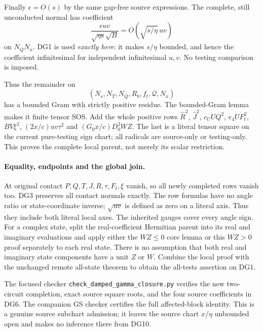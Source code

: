 Finally $\epsilon=O(s)$ by the same gap-free source expressions.
The complete, still unconducted normal has coefficient
\[
 \frac{\epsilon uv}{\sqrt{\eta s}\sqrt B}
         =O\!\left(\sqrt{s/\eta}\,uv\right)          \tag{DG10}
\]
on $N_QN_x$. DG1 is used \emph{exactly here}: it makes $s/\eta$
bounded, and hence the coefficient infinitesimal for independent
infinitesimal $u,v$. No testing comparison is imposed.

Thus the remainder on
\[
                  (N_s,N_T,N_Q,R_b,f_t,\mathcal Q,N_x)
\]
has a bounded Gram with strictly positive residue. The bounded-Gram
lemma makes it finite tensor SOS. Add the whole positive rows
$\widehat R^2$, $\widehat J^2$, $c_UUQ^2$, $e_4UF_t^2$,
$BV\xi^2$, $(2x/c)uv\tau^2$ and
$(G_0x/c)D_0^2WZ$. The last is a literal tensor square on the current
pure-testing sign chart; all radicals are source-only or testing-only.
This proves the complete local parent, not merely its scalar
restriction.

\paragraph{Equality, endpoints and the global join.}
At original contact $P,Q,T,J,R,\tau,F_t,\xi$ vanish, so all newly
completed rows vanish too. DG3 preserves all contact normals exactly.
The row formulas have no angle ratio or state-coordinate inverse;
$\sqrt{uv}$ is defined as zero on a literal axis. Thus they include
both literal local axes. The inherited gauges cover every angle sign.
For a complex state, split the real-coefficient Hermitian parent into
its real and imaginary evaluations and apply either the $WZ\le0$
core lemma or this $WZ>0$ proof separately to each real state. There
is no assumption that both real and imaginary state components have
a unit $Z$ or $W$. Combine the local proof with the unchanged remote
all-state theorem to obtain the all-tests assertion on DG1.

The focused checker \texttt{check\_damped\_gamma\_closure.py}
verifies the new two-circuit completion, exact source square roots,
and the four source coefficients in DG6. The companion GS checker
certifies the full affected-block identity. This is a genuine source
subchart admission; it leaves the source chart $x/\eta$ unbounded
open and makes no inference there from DG10.
